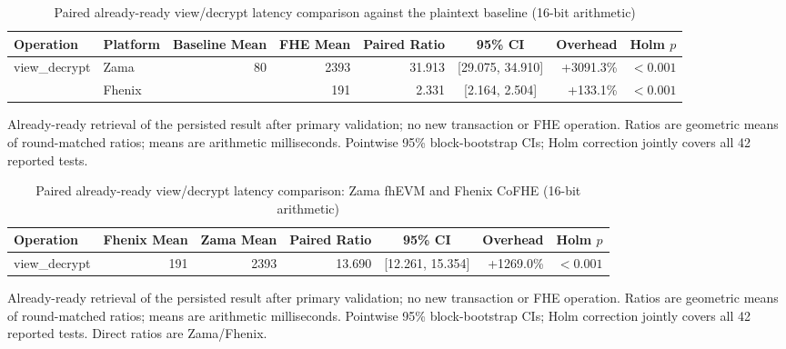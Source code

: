 \begin{table}[!t]
\caption{Paired already-ready view/decrypt latency comparison against the plaintext baseline (16-bit arithmetic)}
\label{tab:paired-lifecycle-comparison-view-16}
\centering
\footnotesize
\setlength{\tabcolsep}{5pt}
\begin{tabular}{|l|l|r|r|r|c|r|r|}
\hline
\textbf{Operation} & \textbf{Platform} & \textbf{Baseline Mean} & \textbf{FHE Mean} & \textbf{Paired Ratio} & \textbf{95\% CI} & \textbf{Overhead} & \textbf{Holm \(p\)} \\
\hline
\multirow{2}{*}{view\_decrypt}
& Zama & \multirow{2}{*}{80} & 2393 & 31.913 & [29.075, 34.910] & +3091.3\% & $<0.001$ \\
& Fhenix &  & 191 & 2.331 & [2.164, 2.504] & +133.1\% & $<0.001$ \\
\hline
\hline
\end{tabular}
\vspace{2pt}
\parbox{\textwidth}{\scriptsize Already-ready retrieval of the persisted result after primary validation; no new transaction or FHE operation. Ratios are geometric means of round-matched ratios; means are arithmetic milliseconds. Pointwise 95\% block-bootstrap CIs; Holm correction jointly covers all 42 reported tests.}
\end{table}

\begin{table}[!t]
\caption{Paired already-ready view/decrypt latency comparison: Zama fhEVM and Fhenix CoFHE (16-bit arithmetic)}
\label{tab:zama-fhenix-lifecycle-comparison-view-16}
\centering
\footnotesize
\setlength{\tabcolsep}{5pt}
\begin{tabular}{|l|r|r|r|c|r|r|}
\hline
\textbf{Operation} & \textbf{Fhenix Mean} & \textbf{Zama Mean} & \textbf{Paired Ratio} & \textbf{95\% CI} & \textbf{Overhead} & \textbf{Holm \(p\)} \\
\hline
view\_decrypt & 191 & 2393 & 13.690 & [12.261, 15.354] & +1269.0\% & $<0.001$ \\
\hline
\end{tabular}
\vspace{2pt}
\parbox{\textwidth}{\scriptsize Already-ready retrieval of the persisted result after primary validation; no new transaction or FHE operation. Ratios are geometric means of round-matched ratios; means are arithmetic milliseconds. Pointwise 95\% block-bootstrap CIs; Holm correction jointly covers all 42 reported tests. Direct ratios are Zama/Fhenix.}
\end{table}

